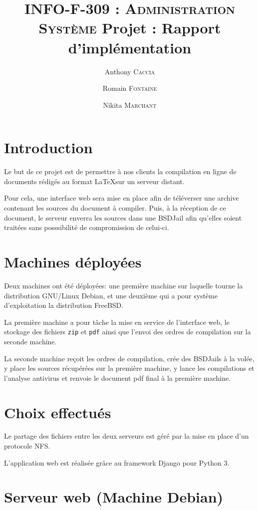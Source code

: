 \documentclass[10pt,a4paper]{article}
\author{Anthony \textsc{Caccia} \and Romain \textsc{Fontaine} \and Nikita \textsc{Marchant} }
\date{}
\title{\textsc{INFO-F-309 : Administration Système} Projet : Rapport d'implémentation}
\begin{document}
\maketitle

\section{Introduction}
\label{sec:Introduction}

Le but de ce projet est de permettre à nos clients la compilation en ligne de documents rédigés au format \LaTeX sur un serveur distant.

Pour cela, une interface web sera mise en place afin de téléverser une archive contenant les sources du document à compiler.
Puis, à la réception de ce document, le serveur enverra les sources dans une BSDJail afin qu'elles soient traitées sans posssibilité de compromission de celui-ci.

\section{Machines déployées}
\label{sec:Machines déployées}

Deux machines ont été déployées: une première machine sur laquelle tourne la distribution GNU/Linux Debian, et une deuxième qui a pour système d'exploitation la distribution FreeBSD.

La première machine a pour tâche la mise en service de l'interface web,
le stockage des fichiers \texttt{zip} et \texttt{pdf}
ainsi que l'envoi des ordres de compilation sur la seconde machine.

La seconde machine reçoit les ordres de compilation, crée des BSDJails à la volée, y place les sources récupérées sur la première machine,
y lance les compilations et l'analyse antivirus et renvoie le document pdf final à la première machine.

\section{Choix effectués}
\label{sec:Choix effectués}

Le partage des fichiers entre les deux serveurs est géré par la mise en place d'un protocole NFS.

L'application web est réalisée grâce au framework Django pour Python 3.

\section{Serveur web (Machine Debian)}
\end{document}
